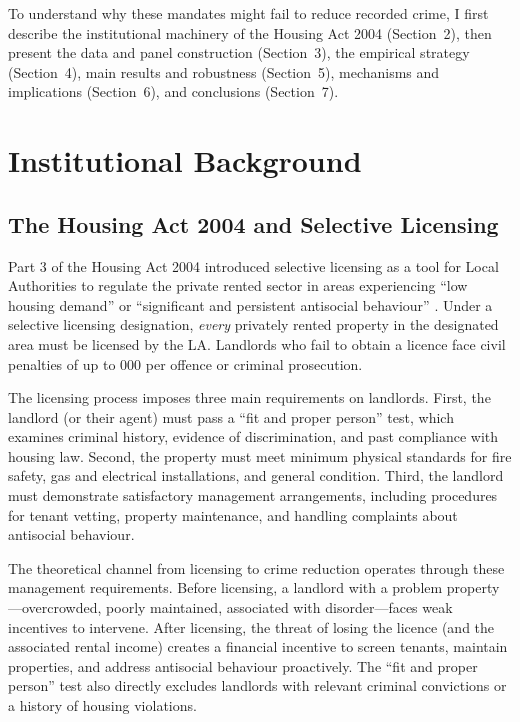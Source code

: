 \documentclass[12pt]{article}
\begin{document}
To understand why these mandates might fail to reduce recorded crime, I first describe the institutional machinery of the Housing Act 2004 (Section~2), then present the data and panel construction (Section~3), the empirical strategy (Section~4), main results and robustness (Section~5), mechanisms and implications (Section~6), and conclusions (Section~7).


\section{Institutional Background}

\subsection{The Housing Act 2004 and Selective Licensing}

Part 3 of the Housing Act 2004 introduced selective licensing as a tool for Local Authorities to regulate the private rented sector in areas experiencing ``low housing demand'' or ``significant and persistent antisocial behaviour'' \citep{housing_act2004}. Under a selective licensing designation, \emph{every} privately rented property in the designated area must be licensed by the LA. Landlords who fail to obtain a licence face civil penalties of up to 000 per offence or criminal prosecution.

The licensing process imposes three main requirements on landlords. First, the landlord (or their agent) must pass a ``fit and proper person'' test, which examines criminal history, evidence of discrimination, and past compliance with housing law. Second, the property must meet minimum physical standards for fire safety, gas and electrical installations, and general condition. Third, the landlord must demonstrate satisfactory management arrangements, including procedures for tenant vetting, property maintenance, and handling complaints about antisocial behaviour.

The theoretical channel from licensing to crime reduction operates through these management requirements. Before licensing, a landlord with a problem property---overcrowded, poorly maintained, associated with disorder---faces weak incentives to intervene. After licensing, the threat of losing the licence (and the associated rental income) creates a financial incentive to screen tenants, maintain properties, and address antisocial behaviour proactively. The ``fit and proper person'' test also directly excludes landlords with relevant criminal convictions or a history of housing violations.
\end{document}

